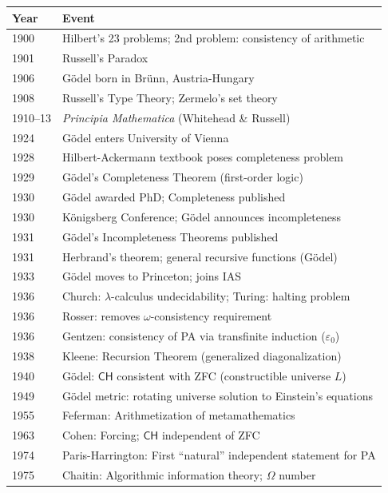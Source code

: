 \begin{tabularx}{\linewidth}{|l|X|}
\hline
\textbf{Year} & \textbf{Event} \\ \hline
1900 & Hilbert's 23 problems; 2nd problem: consistency of arithmetic \\ \hline
1901 & Russell's Paradox \\ \hline
1906 & Gödel born in Brünn, Austria-Hungary \\ \hline
1908 & Russell's Type Theory; Zermelo's set theory \\ \hline
1910--13 & \emph{Principia Mathematica} (Whitehead \& Russell) \\ \hline
1924 & Gödel enters University of Vienna \\ \hline
1928 & Hilbert-Ackermann textbook poses completeness problem \\ \hline
1929 & Gödel's Completeness Theorem (first-order logic) \\ \hline
1930 & Gödel awarded PhD; Completeness published \\ \hline
1930 & Königsberg Conference; Gödel announces incompleteness \\ \hline
1931 & Gödel's Incompleteness Theorems published \\ \hline
1931 & Herbrand's theorem; general recursive functions (Gödel) \\ \hline
1933 & Gödel moves to Princeton; joins IAS \\ \hline
1936 & Church: $\lambda$-calculus undecidability; Turing: halting problem \\ \hline
1936 & Rosser: removes $\omega$-consistency requirement \\ \hline
1936 & Gentzen: consistency of PA via transfinite induction ($\varepsilon_0$) \\ \hline
1938 & Kleene: Recursion Theorem (generalized diagonalization) \\ \hline
1940 & Gödel: $\mathsf{CH}$ consistent with ZFC (constructible universe $L$) \\ \hline
1949 & Gödel metric: rotating universe solution to Einstein's equations \\ \hline
1955 & Feferman: Arithmetization of metamathematics \\ \hline
1963 & Cohen: Forcing; $\mathsf{CH}$ independent of ZFC \\ \hline
1974 & Paris-Harrington: First ``natural'' independent statement for PA \\ \hline
1975 & Chaitin: Algorithmic information theory; $\Omega$ number \\ \hline

\end{tabularx}
